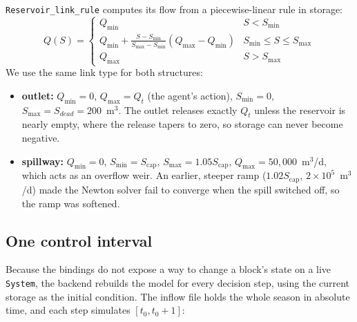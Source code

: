 \documentclass[11pt]{article}
\newcommand{\Scap}{S_{\mathrm{cap}}}
\newcommand{\code}[1]{\texttt{#1}}
\begin{document}
\code{Reservoir\_link\_rule} computes its flow from a piecewise-linear rule
in storage:
\begin{equation}
Q(S) = \begin{cases} Q_{\min} & S < S_{\min}\\
Q_{\min} + \frac{S-S_{\min}}{S_{\max}-S_{\min}}(Q_{\max}-Q_{\min}) & S_{\min}\le S\le S_{\max}\\
Q_{\max} & S > S_{\max}\end{cases}
\end{equation}
We use the same link type for both structures:
\begin{itemize}
\item \textbf{outlet:} $Q_{\min}=0$, $Q_{\max}=Q_t$ (the agent's action),
$S_{\min}=0$, $S_{\max}=S_{dead}=200$~m$^3$. The outlet releases exactly
$Q_t$ unless the reservoir is nearly empty, where the release tapers to
zero, so storage can never become negative.
\item \textbf{spillway:} $Q_{\min}=0$, $S_{\min}=\Scap$,
$S_{\max}=1.05\Scap$, $Q_{\max}=50{,}000$~m$^3$/d, which acts as an overflow
weir. An earlier, steeper ramp ($1.02\Scap$, $2\times10^5$~m$^3$/d) made
the Newton solver fail to converge when the spill switched off, so the
ramp was softened.
\end{itemize}

\subsection{One control interval}
Because the bindings do not expose a way to change a block's state on a
live \code{System}, the backend rebuilds the model for every decision step,
using the current storage as the initial condition. The inflow file holds
the whole season in absolute time, and each step simulates
$[t_0,t_0+1]$:
\end{document}
